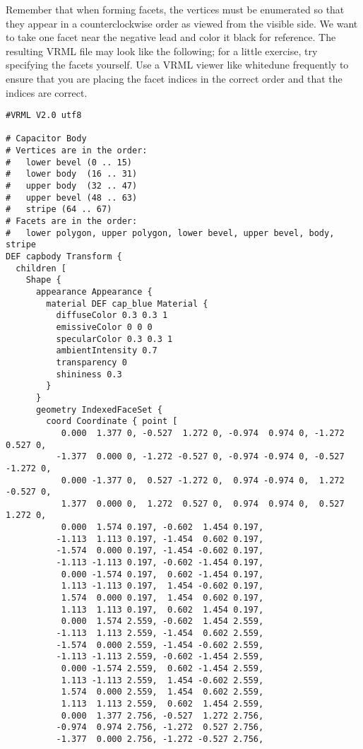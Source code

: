 \documentclass[a4paper]{article}
\begin{document}
Remember that when forming facets, the vertices must be enumerated so that they appear
in a counterclockwise order as viewed from the visible side.  We want to take one facet
near the negative lead and color it black for reference. The resulting VRML file may
look like the following; for a little exercise, try specifying the facets yourself.
Use a VRML viewer like whitedune frequently to ensure that you are placing the facet
indices in the correct order and that the indices are correct.

\begin{verbatim}
#VRML V2.0 utf8

# Capacitor Body
# Vertices are in the order:
#   lower bevel (0 .. 15)
#   lower body  (16 .. 31)
#   upper body  (32 .. 47)
#   upper bevel (48 .. 63)
#   stripe (64 .. 67)
# Facets are in the order:
#   lower polygon, upper polygon, lower bevel, upper bevel, body, stripe
DEF capbody Transform {
  children [
    Shape {
      appearance Appearance {
        material DEF cap_blue Material {
          diffuseColor 0.3 0.3 1
          emissiveColor 0 0 0
          specularColor 0.3 0.3 1
          ambientIntensity 0.7
          transparency 0
          shininess 0.3
        }
      }
      geometry IndexedFaceSet {
        coord Coordinate { point [
           0.000  1.377 0, -0.527  1.272 0, -0.974  0.974 0, -1.272  0.527 0,
          -1.377  0.000 0, -1.272 -0.527 0, -0.974 -0.974 0, -0.527 -1.272 0,
           0.000 -1.377 0,  0.527 -1.272 0,  0.974 -0.974 0,  1.272 -0.527 0,
           1.377  0.000 0,  1.272  0.527 0,  0.974  0.974 0,  0.527  1.272 0,
           0.000  1.574 0.197, -0.602  1.454 0.197,
          -1.113  1.113 0.197, -1.454  0.602 0.197,
          -1.574  0.000 0.197, -1.454 -0.602 0.197,
          -1.113 -1.113 0.197, -0.602 -1.454 0.197,
           0.000 -1.574 0.197,  0.602 -1.454 0.197,
           1.113 -1.113 0.197,  1.454 -0.602 0.197,
           1.574  0.000 0.197,  1.454  0.602 0.197,
           1.113  1.113 0.197,  0.602  1.454 0.197,
           0.000  1.574 2.559, -0.602  1.454 2.559,
          -1.113  1.113 2.559, -1.454  0.602 2.559,
          -1.574  0.000 2.559, -1.454 -0.602 2.559,
          -1.113 -1.113 2.559, -0.602 -1.454 2.559,
           0.000 -1.574 2.559,  0.602 -1.454 2.559,
           1.113 -1.113 2.559,  1.454 -0.602 2.559,
           1.574  0.000 2.559,  1.454  0.602 2.559,
           1.113  1.113 2.559,  0.602  1.454 2.559,
           0.000  1.377 2.756, -0.527  1.272 2.756,
          -0.974  0.974 2.756, -1.272  0.527 2.756,
          -1.377  0.000 2.756, -1.272 -0.527 2.756,

\end{verbatim}
\end{document}
